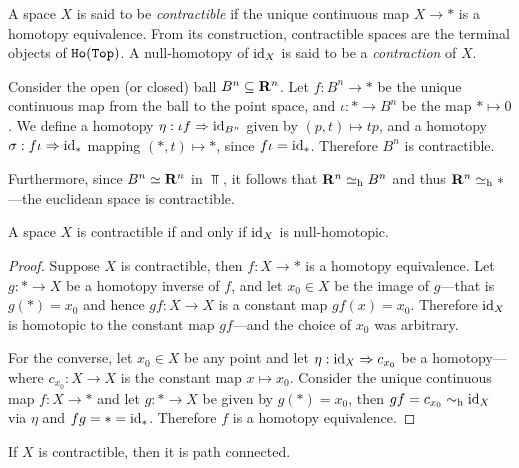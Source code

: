 \begin{definition}
\label{def:contractible-space}
A space \(X\) is said to be \emph{contractible} if the unique continuous map
\(X \to *\) is a homotopy equivalence. From its construction, contractible
spaces are the terminal objects of \({\texttt{Ho}(\texttt{Top})}\). A null-homotopy of \(\operatorname{id}_X\) is
said to be a \emph{contraction} of \(X\).
\end{definition}

\begin{example}
\label{exp:ball-contractible}
Consider the open (or closed) ball \(B^n \subseteq \mathbf{R}^n\). Let \(f: B^n \to *\)
be the unique continuous map from the ball to the point space, and
\(\iota: * \to B^n\) be the map \(* \mapsto 0\). We define a homotopy
\(\eta: \iota f \Rightarrow \operatorname{id}_{B^n}\) given by \((p, t) \mapsto t p\), and a homotopy
\(\sigma: f \iota \Rightarrow \operatorname{id}_{*}\) mapping \((*, t) \mapsto *\), since
\(f \iota = \operatorname{id}_{*}\). Therefore \(B^n\) is contractible.

Furthermore, since \(B^n \simeq \mathbf{R}^n\) in \(\Top\), it follows that \(\mathbf{R}^n \simeq_{\text{h}}
B^n\) and thus \(\mathbf{R}^n \simeq_{\text{h}} *\) ---the euclidean space is contractible.
\end{example}

\begin{proposition}
\label{prop:contractible-iff-id-is-htpy-const}
A space \(X\) is contractible if and only if \(\operatorname{id}_X\) is null-homotopic.
\end{proposition}

\begin{proof}
Suppose \(X\) is contractible, then \(f: X \to *\) is a homotopy
equivalence. Let \(g: * \to X\) be a homotopy inverse of \(f\), and let \(x_0
\in X\) be the image of \(g\)---that is \(g(*) = x_0\) and hence \(g f: X \to
X\) is a constant map \(g f(x) = x_0\). Therefore \(\operatorname{id}_X\) is homotopic to the
constant map \(g f\)---and the choice of \(x_0\) was arbitrary.

For the converse, let \(x_0 \in X\) be any point and let \(\eta: \operatorname{id}_X \Rightarrow
c_{x_0}\) be a homotopy---where \(c_{x_0}: X \to X\) is the constant map \(x
\mapsto x_0\). Consider the unique continuous map \(f: X \to *\) and let \(g: *
\to X\) be given by \(g(*) = x_0\), then \(g f = c_{x_0} \sim_{\text{h}} \operatorname{id}_X\) via
\(\eta\) and \(f g = * = \operatorname{id}_{*}\). Therefore \(f\) is a homotopy equivalence.
\end{proof}

\begin{proposition}
\label{prop:contractible-then-path-connected}
If \(X\) is contractible, then it is path connected.
\end{proposition}


